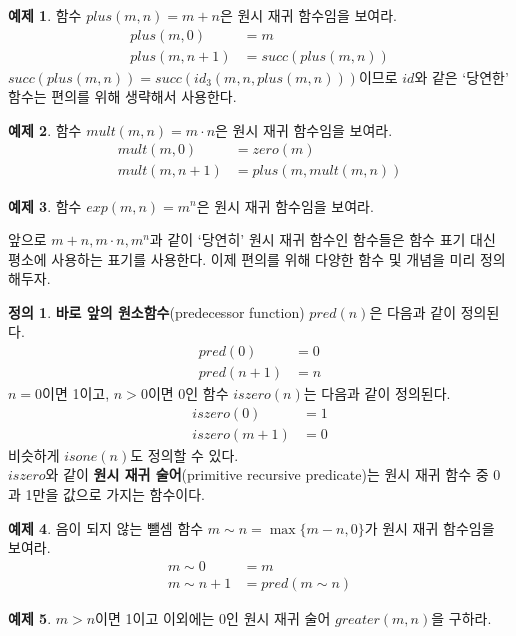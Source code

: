 \documentclass[b5paper]{book}
\theoremstyle{definition}
\newtheorem{defn}{정의}[chapter]
\newtheorem{ex}{예제}[chapter]
\begin{document}
\begin{ex}
    함수 $plus(m, n) = m+n$은 원시 재귀 함수임을 보여라. 
    \begin{align*}
        plus(m, 0) &= m \\
        plus(m, n+1) &= succ(plus(m, n)) 
    \end{align*}
    $succ(plus(m,n)) = succ(id_3(m, n, plus(m, n)))$이므로 $id$와 같은 `당연한' 함수는 
    편의를 위해 생략해서 사용한다.
\end{ex}
\begin{ex}
    함수 $mult(m,n) = m\cdot n$은 원시 재귀 함수임을 보여라.
    \begin{align*}
        mult(m,0) &= zero(m) \\ 
        mult(m,n+1) &= plus(m,mult(m,n))
    \end{align*}
\end{ex}
\begin{ex}
    함수 $exp(m,n) = m^n$은 원시 재귀 함수임을 보여라.
\end{ex}
앞으로 $m+n, m\cdot n, m^n$과 같이 `당연히' 원시 재귀 함수인 함수들은 함수 
표기 대신 평소에 사용하는 표기를 사용한다. 이제 편의를 위해 다양한 함수 및 개념을 미리 정의해두자. 
\begin{defn}
    \textbf{바로 앞의 원소함수}(predecessor function) $pred(n)$은 다음과 같이 정의된다.
    \begin{align*}
        pred(0) &= 0 \\ 
        pred(n+1) &= n
    \end{align*}
    $n = 0$이면 1이고, $n>0$이면 0인 함수 $iszero(n)$는 다음과 같이 정의된다.
    \begin{align*}
        iszero(0) &= 1 \\ 
        iszero(m+1) &= 0 
    \end{align*}
    비슷하게 $isone(n)$도 정의할 수 있다. \\ 
    $iszero$와 같이
    \textbf{원시 재귀 술어}(primitive recursive predicate)는 원시 재귀 함수 중 0과 1만을 값으로 가지는 함수이다.
\end{defn}
\begin{ex}
    음이 되지 않는 뺄셈 함수 $m \sim n = \max \{ m - n , 0\}$가 원시 재귀 함수임을 보여라.
    \begin{align*}
        m \sim 0 &= m \\ 
        m \sim n+1 &= pred(m \sim n) 
    \end{align*}
\end{ex}
\begin{ex}
    $m > n$이면 1이고 이외에는 0인 원시 재귀 술어 $greater(m,n)$을 구하라. 
\end{ex}
\end{document}
